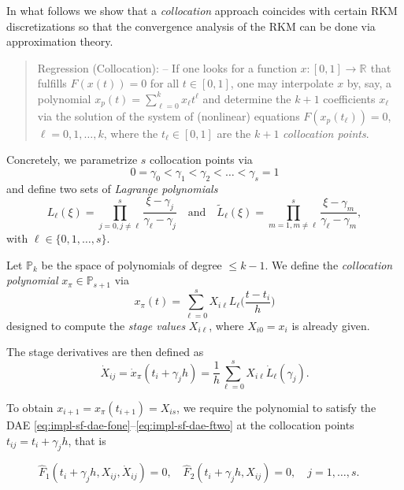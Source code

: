 \documentclass[]{book}
\theoremstyle{definition}
\theoremstyle{definition}
\theoremstyle{definition}
\theoremstyle{definition}
\theoremstyle{remark}
\begin{document}
In what follows we show that a \emph{collocation} approach coincides with certain RKM discretizations so that the convergence analysis of the RKM can be done via approximation theory.

\begin{quote}
Regression (Collocation): -- If one looks for a function \(x\colon [0,1] \to \mathbb R^{}\) that fulfills \(F(x(t))=0\) for all \(t\in[0,1]\), one may interpolate \(x\) by, say, a polynomial \(x_p(t) = \sum_{\ell=0}^kx_\ell t^\ell\) and determine the \(k+1\) coefficients \(x_\ell\) via the solution of the system of (nonlinear) equations \(F(x_p(t_\ell))=0\), \(\ell=0,1,\dotsc,k\), where the \(t_\ell\in[0,1]\) are the \(k+1\) \emph{collocation points}.
\end{quote}

Concretely, we parametrize \(s\) collocation points via
\begin{equation}
0 = \gamma_0 < \gamma_1 <\gamma_2< \dotsc < \gamma_s=1 \label{eq:rkm-collo-gamma}
\end{equation}
and define two sets of \emph{Lagrange polynomials}
\[
L_\ell(\xi) = \prod_{j=0,j\neq \ell}^s \frac{\xi-\gamma_j}{\gamma_\ell-\gamma_j}
\quad\text{and}\quad
\tilde L_\ell(\xi) = \prod_{m=1,m\neq \ell}^s \frac{\xi-\gamma_m}{\gamma_\ell-\gamma_m},
\]
with \(\ell\in\{0,1,\dotsc,s\}\).

Let \(\mathbb P_k\) be the space of polynomials of degree \(\leq k-1\). We define the \emph{collocation polynomial} \(x_\pi \in \mathbb P_{s+1}\) via
\begin{equation}
x_\pi (t) = \sum_{\ell=0}^s X_{i\ell}L_\ell\bigl(\frac{t-t_i}{h}\bigr)
\label{eq:rkm-coll-collpol}
\end{equation}
designed to compute the \emph{stage values} \(X_{i\ell}\), where \(X_{i0}=x_i\) is already given.

The stage derivatives are then defined as
\begin{equation}
\dot X_{ij} = \dot x_\pi(t_i+\gamma_jh) = \frac 1h \sum_{\ell=0}^sX_{i\ell}\dot L_\ell(\gamma_j). \label{eq:rkm-coll-staged}
\end{equation}

To obtain \(x_{i+1}=x_\pi(t_{i+1})=X_{is}\), we require the polynomial to satisfy the DAE \eqref{eq:impl-sf-dae-fone}--\eqref{eq:impl-sf-dae-ftwo} at the collocation points \(t_{ij}=t_i+\gamma_jh\), that is

\begin{equation}
\hat F_1(t_i+\gamma_jh,X_{ij},\dot X_{ij}) = 0, \quad \hat F_2(t_i+\gamma_jh,X_{ij}) = 0, \quad j=1,\dotsc,s. \phantom{F_1} \label{eq:impl-sf-dae-collo}
\end{equation}
\end{document}
